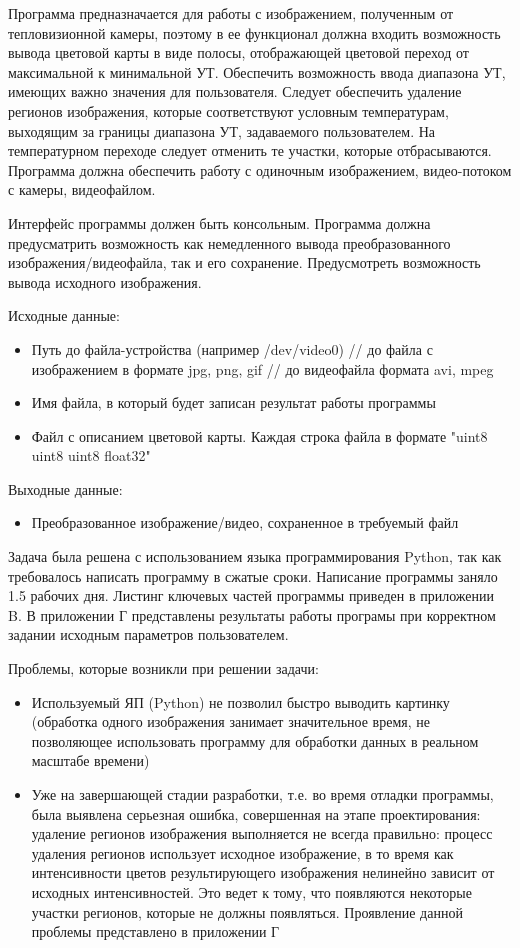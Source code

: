 	Программа предназначается для работы с изображением, полученным от тепловизионной камеры, поэтому в ее функционал должна входить возможность вывода цветовой карты в виде полосы, отображающей цветовой переход от максимальной к минимальной УТ.
	Обеспечить возможность ввода диапазона УТ, имеющих важно значения для пользователя. Следует обеспечить удаление регионов изображения, которые соответствуют условным температурам, выходящим за границы диапазона УТ, задаваемого пользователем. 
	На температурном переходе следует отменить те участки, которые отбрасываются.
	Программа должна обеспечить работу с одиночным изображением, видео-потоком с камеры, видеофайлом. 

	Интерфейс программы должен быть консольным. Программа должна предусматрить возможность как немедленного вывода преобразованного изображения/видеофайла, так и его сохранение. Предусмотреть возможность вывода исходного изображения.

Исходные данные:
\begin{itemize}
	\item Путь до файла-устройства (например /dev/video0) // до файла с изображением в формате jpg, png, gif // до видеофайла формата avi, mpeg
	\item Имя файла, в который будет записан результат работы программы
	\item Файл с описанием цветовой карты. Каждая строка файла в формате "uint8 uint8 uint8 float32"
\end{itemize}
Выходные данные:
\begin{itemize}
	\item Преобразованное изображение/видео, сохраненное в требуемый файл
\end{itemize}

	Задача была решена с использованием языка программирования Python, так как требовалось написать программу в сжатые сроки. Написание программы заняло 1.5 рабочих дня. Листинг ключевых частей программы приведен в приложении B. В приложении Г представлены результаты работы програмы при корректном задании исходным параметров пользователем. 

	Проблемы, которые возникли при решении задачи:
\begin{itemize}
	\item Используемый ЯП (Python) не позволил быстро выводить картинку (обработка одного изображения занимает значительное время, не позволяющее использовать программу для обработки данных в реальном масштабе времени)
	\item Уже на завершающей стадии разработки, т.е. во время отладки программы, была выявлена серьезная ошибка, совершенная на этапе проектирования: удаление регионов изображения выполняется не всегда правильно: процесс удаления регионов использует исходное изображение, в то время как интенсивности цветов результирующего изображения нелинейно зависит от исходных интенсивностей. Это ведет к тому, что появляются некоторые участки регионов, которые не должны появляться. Проявление данной проблемы представлено в приложении Г
\end{itemize}

